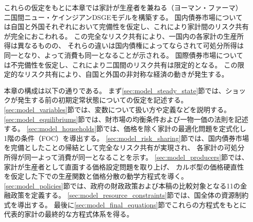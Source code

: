 これらの仮定をもとに本章では家計が生産者を兼ねる（ヨーマン・ファーマ）
二国間ニュー・ケインジアンDSGEモデルを構築する。
国内債券市場については自国と外国それぞれにおいて完備性を仮定し、これにより家計間のリスク共有が完全におこわれる。
この完全なリスク共有により、一国内の各家計の生産所得は異なるものの、
それらの違いは国内債権によってならされて可処分所得は同一となり、よって消費も同一となることが示される。
国際債券市場については不完備性を仮定し、これにより二国間のリスク共有は限定的となる。
この限定的なリスク共有により、自国と外国の非対称な経済の動きが発生する。



本章の構成は以下の通りである。
まず\ref{sec:model_steady_state}節では、ショックが発生する前の初期定常状態についての仮定を記述する。
\ref{sec:model_variables}節では、変数について扱い方や定義などを説明する。
\ref{sec:model_equilibriums}節では、財市場の均衡条件および一物一価の法則を記述する。
\ref{sec:model_households}節では、価格を除く家計の最適化問題を定式化し1階の条件（FOC）を導出する。
\ref{sec:model_risk_sharing}節では、国内債券市場を完備としたことの帰結として完全なリスク共有が実現され、
各家計の可処分所得が同一よって消費が同一となることを示す。
\ref{sec:model_producers}節では、家計が生産者として直面する価格設定問題を取り上げ、
カルボ型の価格硬直性を仮定した下での生産関数と価格分散の動学方程式を導く。
\ref{sec:model_policies}節では、政府の財政政策および本稿の比較対象となる11の金融政策を定義する。
\ref{sec:model_resource_constraints}節では、国全体の資源制約式を導出する。
最後に\ref{sec:model_final_equations}節でこれらの方程式をもとに代表的家計の最終的な方程式体系を得る。